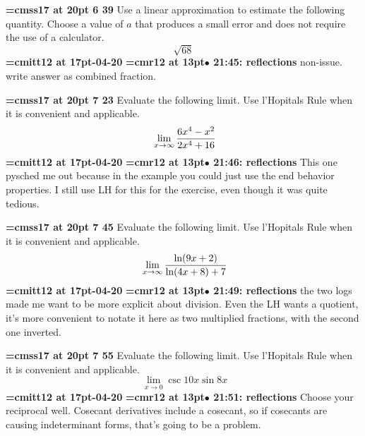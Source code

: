 {\medskip\noindent\bf\font\titlefont=cmss17 at 20pt 6 39}\medskip
Use a linear approximation to estimate the following quantity.
Choose a value of $a$ that produces a small error and does
not require the use of a calculator.
$$
\sqrt{68}
$$
{\medskip\noindent\bf\font\titlefont=cmitt12 at 17pt-04-20}\medskip
{\smallskip\noindent\bf\font\titlefont=cmr12 at 13pt\titlefont $\bullet$ 21:45: reflections}\smallskip
non-issue. write answer as combined fraction.
\par

{\medskip\noindent\bf\font\titlefont=cmss17 at 20pt 7 23}\medskip
Evaluate the following limit. Use l'Hopitals Rule when it is convenient
and applicable.
$$\
\lim_{x \to \infty}
{
6x^4 - x^2
\over
2x^4 + 16
}
$$
{\medskip\noindent\bf\font\titlefont=cmitt12 at 17pt-04-20}\medskip
{\smallskip\noindent\bf\font\titlefont=cmr12 at 13pt\titlefont $\bullet$ 21:46: reflections}\smallskip
This one pysched me out because in the example you could just use the end behavior properties. I still use LH for this for the exercise, even though it was quite tedious.
\par

{\medskip\noindent\bf\font\titlefont=cmss17 at 20pt 7 45}\medskip
Evaluate the following limit. Use l'Hopitals Rule when it is convenient
and applicable.
$$\
\lim_{x \to \infty}
{
\ln(9x + 2)
\over
\ln(4x + 8) + 7
}
$$
{\medskip\noindent\bf\font\titlefont=cmitt12 at 17pt-04-20}\medskip
{\smallskip\noindent\bf\font\titlefont=cmr12 at 13pt\titlefont $\bullet$ 21:49: reflections}\smallskip
the two logs made me want to be more explicit about division. Even the LH wants a quotient, it's more convenient to notate it here as two multiplied fractions, with the second one inverted.
\par

{\medskip\noindent\bf\font\titlefont=cmss17 at 20pt 7 55}\medskip
Evaluate the following limit. Use l'Hopitals Rule when it is convenient
and applicable.
$$\
\lim_{x \to 0}
{
\csc 10x \sin 8x
}
$$
{\medskip\noindent\bf\font\titlefont=cmitt12 at 17pt-04-20}\medskip
{\smallskip\noindent\bf\font\titlefont=cmr12 at 13pt\titlefont $\bullet$ 21:51: reflections}\smallskip
Choose your reciprocal well. Cosecant derivatives include a cosecant, so if cosecants are causing indeterminant forms, that's going to be a problem.
\par


